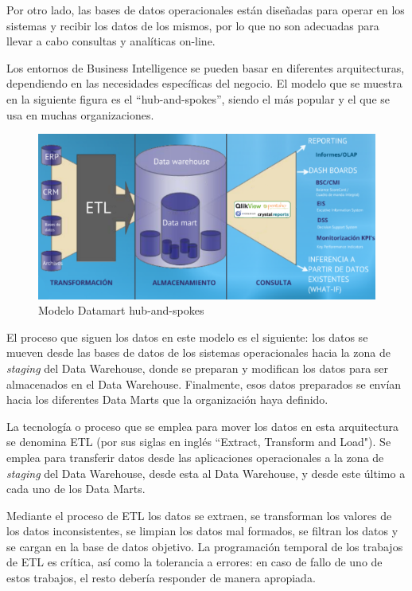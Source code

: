 \documentclass[a4paper, 12pt]{book}
\begin{document}
Por otro lado, las bases de datos operacionales están diseñadas para operar en los sistemas y recibir los datos de los mismos, por lo que no son adecuadas para llevar a cabo consultas y analíticas on-line.

Los entornos de Business Intelligence se pueden basar en diferentes arquitecturas, dependiendo en las necesidades específicas del negocio. El modelo que se muestra en la siguiente figura es el “hub-and-spokes”, siendo el más popular y el que se usa en muchas organizaciones.

\begin{figure}
   \centering
   \includegraphics[width=12cm, keepaspectratio]{img/modelo_Datamart}
   \caption{Modelo Datamart hub-and-spokes}
   \label{fig:modelo_Datamart}
\end{figure}

El proceso que siguen los datos en este modelo es el siguiente: los datos se mueven desde las bases de datos de los sistemas operacionales hacia la zona de \textit{staging} del Data Warehouse, donde se preparan y modifican los datos para ser almacenados en el Data Warehouse. Finalmente, esos datos preparados se envían hacia los diferentes Data Marts que la organización haya definido.

La tecnología o proceso que se emplea para mover los datos en esta arquitectura se denomina ETL (por sus siglas en inglés ``Extract, Transform and Load"). Se emplea para transferir datos desde las aplicaciones operacionales a la zona de \textit{staging} del Data Warehouse, desde esta al Data Warehouse, y desde este último a cada uno de los Data Marts.

Mediante el proceso de ETL los datos se extraen, se transforman los valores de los datos inconsistentes, se limpian los datos mal formados, se filtran los datos y se cargan en la base de datos objetivo. La programación temporal de los trabajos de ETL es crítica, así como la tolerancia a errores: en caso de fallo de uno de estos trabajos, el resto debería responder de manera apropiada.
\end{document}
